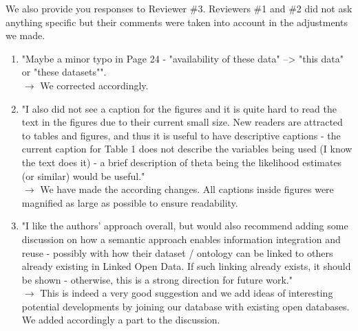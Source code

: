 \documentclass[11pt,a4paper,sans]{moderncv}        %
\begin{document}
\bigskip

We also provide you responses to Reviewer \#3. Reviewers \#1 and \#2 did not ask anything specific but their comments were taken into account in the adjustments we made.
\begin{enumerate}
\item "Maybe a minor typo in Page 24 - "availability of these data" --> "this data" or "these datasets"".\\
$\rightarrow$ We corrected accordingly.
\item "I also did not see a caption for the figures and it is quite hard to read the text in the figures due to their current small size. New readers are attracted to tables and figures, and thus it is useful to have descriptive captions - the current caption for Table 1 does not describe the variables being used (I know the text does it) - a brief description of theta being the likelihood estimates (or similar) would be useful."\\
$\rightarrow$ We have made the according changes. All captions inside figures were magnified as large as possible to ensure readability.
\item "I like the authors' approach overall, but would also recommend adding some discussion on how a semantic approach enables information integration and reuse - possibly with how their dataset / ontology can be linked to others already existing in Linked Open Data. If such linking already exists, it should be shown - otherwise, this is a strong direction for future work."\\
$\rightarrow$ This is indeed a very good suggestion and we add ideas of interesting potential developments by joining our database with existing open databases. We added accordingly a part to the discussion.
\end{enumerate}
\justify

\end{document}
